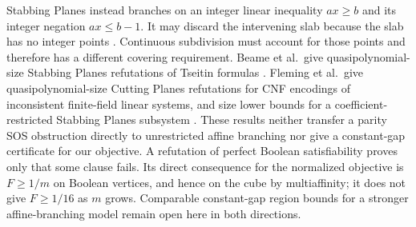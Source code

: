 Stabbing Planes instead branches on an integer linear inequality
$ax\ge b$ and its integer negation $ax\le b-1$. It may discard the
intervening slab because the slab has no integer points
\citep[Section 1]{BeameEtAl2023}. Continuous subdivision must account
for those points and therefore has a different covering requirement.
Beame et al.\ give quasipolynomial-size Stabbing Planes refutations of
Tseitin formulas \citep[Theorem 1]{BeameEtAl2023}. Fleming et al.\ give
quasipolynomial-size Cutting Planes refutations for CNF encodings of
inconsistent finite-field linear systems, and size lower bounds for a
coefficient-restricted Stabbing Planes subsystem
\citep[Theorems 1.3--1.4]{FlemingEtAl2021}. These results neither transfer a parity SOS obstruction directly to
unrestricted affine branching nor give a constant-gap certificate for our
objective. A refutation of perfect Boolean satisfiability proves only
that some clause fails. Its direct consequence for the normalized
objective is $F\ge1/m$ on Boolean vertices, and hence on the cube by
multiaffinity; it does not give $F\ge1/16$ as $m$ grows. Comparable
constant-gap region bounds for a stronger affine-branching model remain
open here in both directions.
